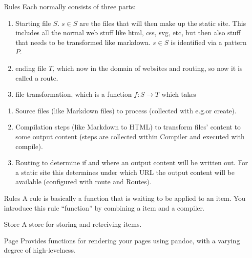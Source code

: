 \documentclass[openany, 12pt]{article}
\begin{document}
\begin{definition}{Rules}{}
	Each  normally consists of three parts:

	\begin{enumerate}[label = {(\arabic*)}]
		\item Starting file $S$.  $s \in S$ are the files that will then make up the
		      static site. This includes all the normal web stuff like html, css,
		      svg, etc, but then also stuff that needs to be transformed like
		      markdown. $s\in S$ is identified via a pattern $P$.
		\item ending file $T$, which now in the domain of websites and routing,
		      so now it is called a route.
		\item file transformation, which is a function $f: S \rightarrow T$
		      which takes
	\end{enumerate}

	\begin{enumerate}[label = {(\arabic*)}]
		\item Source files (like Markdown files) to process (collected with
		      e.g.\@match or create).
		\item Compilation steps (like Markdown to HTML) to transform files'
		      content to some output content (steps are collected within Compiler
		      and executed with compile).
		\item Routing to determine if and where an output content will be
		      written out. For a static site this determines under which URL the
		      output content will be available (configured with route and
		      Routes).
	\end{enumerate}
\end{definition}

\begin{intuition}{Rules}{}
	A rule is basically a function that is waiting to be applied to an item.
	You introduce this rule ``function'' by combining a item and a compiler.
\end{intuition}

\begin{definition}{Store}{}
	A store for storing and retreiving items.
\end{definition}

\begin{definition}{Page}{}
	Provides functions for rendering your pages using pandoc, with a varying
	degree of high-levelness.
\end{definition}
\end{document}
